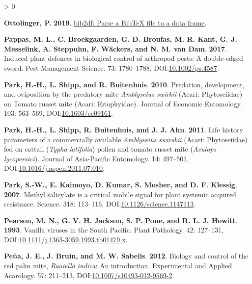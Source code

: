 \documentclass{ufdissertation}[overrideChapters] %
\newlength{\cslhangindent}
\newenvironment{CSLReferences}[2] %
 {%
  \setlength{\parindent}{0pt}
  \ifodd #1 \everypar{\setlength{\hangindent}{\cslhangindent}}\ignorespaces\fi
  \ifnum #2 > 0
  \setlength{\parskip}{#2\baselineskip}
  \fi
 }%
 {}
\begin{document}
{\begin{CSLReferences}{1}{1}
\leavevmode{}%
\textbf{Ottolinger, P.} \textbf{2019}. \href{https://CRAN.R-project.org/package=bib2df}{{bib2df}: Parse a {BibTeX} file to a data frame}.

\leavevmode{}%
\textbf{Pappas, M. L., C. Broekgaarden, G. D. Broufas, M. R. Kant, G. J. Messelink, A. Steppuhn, F. Wäckers, and N. M. van Dam}. \textbf{2017}. Induced plant defences in biological control of arthropod pests: A double-edged sword. Pest Management Science. 73: 1780--1788, DOI:\href{https://doi.org/10.1002/ps.4587}{10.1002/ps.4587}.

\leavevmode{}%
\textbf{Park, H.-H., L. Shipp, and R. Buitenhuis}. \textbf{2010}. Predation, development, and oviposition by the predatory mite {\emph{Amblyseius swirkii}} ({Acari}: {Phytoseiidae}) on {Tomato russet mite} ({Acari}: {Eriophyidae}). Journal of Economic Entomology. 103: 563--569, DOI:\href{https://doi.org/10.1603/ec09161}{10.1603/ec09161}.

\leavevmode{}%
\textbf{Park, H.-H., L. Shipp, R. Buitenhuis, and J. J. Ahn}. \textbf{2011}. Life history parameters of a commercially available {\emph{Amblyseius swirskii}} ({Acari}: {Phytoseiidae}) fed on cattail ({\emph{Typha latifolia}}) pollen and tomato russet mite ({\emph{Aculops lycopersici}}). Journal of Asia-Pacific Entomology. 14: 497--501, DOI:\href{https://doi.org/10.1016/j.aspen.2011.07.010}{10.1016/j.aspen.2011.07.010}.

\leavevmode{}%
\textbf{Park, S.-W., E. Kaimoyo, D. Kumar, S. Mosher, and D. F. Klessig}. \textbf{2007}. Methyl salicylate is a critical mobile signal for plant systemic acquired resistance. Science. 318: 113--116, DOI:\href{https://doi.org/10.1126/science.1147113}{10.1126/science.1147113}.

\leavevmode{}%
\textbf{Pearson, M. N., G. V. H. Jackson, S. P. Pone, and R. L. J. Howitt}. \textbf{1993}. Vanilla viruses in the {South Pacific}. Plant Pathology. 42: 127--131, DOI:\href{https://doi.org/10.1111/j.1365-3059.1993.tb01479.x}{10.1111/j.1365-3059.1993.tb01479.x}.

\leavevmode{}%
\textbf{Peña, J. E., J. Bruin, and M. W. Sabelis}. \textbf{2012}. Biology and control of the red palm mite, {\emph{Raoiella indica}}: An introduction. Experimental and Applied Acarology. 57: 211--213, DOI:\href{https://doi.org/10.1007/s10493-012-9569-2}{10.1007/s10493-012-9569-2}.


\end{CSLReferences}}
\end{document}
